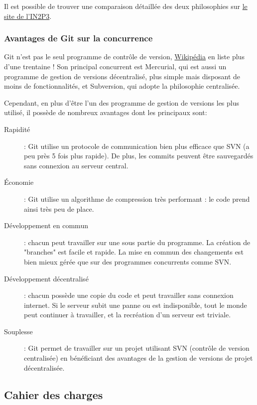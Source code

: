 Il est possible de trouver une comparaison détaillée des deux philosophies sur
\href{http://informatique.in2p3.fr/?q=node/333}{le site de l'IN2P3}.


\subsubsection{Avantages de Git sur la concurrence}

Git n'est pas le seul programme de contrôle de version,
\href{http://en.wikipedia.org/wiki/Comparison_of_revision_control_software}{Wikipédia} en liste plus d'une trentaine !
Son principal concurrent est Mercurial, qui est aussi un programme de gestion de versions décentralisé,
plus simple mais disposant de moins de fonctionnalités, et Subversion, qui adopte la philosophie centralisée.

Cependant, en plus d'être l'un des programme de gestion de versions les plus utilisé,
 il possède de nombreux avantages dont les principaux sont:
\begin{description}
  \item[Rapidité] : Git utilise un protocole de communication bien plus efficace que SVN (a peu près 5 fois plus rapide). 
  De plus, les commits peuvent être sauvegardés sans connexion au serveur central.
  \item[Économie] : Git utilise un algorithme de compression très performant : le code prend ainsi très peu de place.
  \item[Développement en commun] : chacun peut travailler sur une sous partie du programme. La création de "branches" est facile et
  rapide. La mise en commun des changements est bien mieux gérée que sur des programmes concurrents comme SVN.
  \item[Développement décentralisé] : chacun possède une copie du code et peut travailler sans connexion internet. 
  Si le serveur subit une panne ou est indisponible, tout le monde peut continuer à travailler, et la recréation d'un serveur est triviale.
  \item[Souplesse] : Git permet de travailler sur un projet utilisant SVN (contrôle de version centralisée)
  en bénéficiant des avantages de la gestion de versions de projet décentralisée.
\end{description}

\subsection{Cahier des charges}

